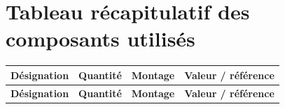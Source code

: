 \documentclass{report}
\begin{document}
\newpage

\chapter{Tableau récapitulatif des composants utilisés}

\small
\renewcommand{\arraystretch}{1.25}

\begin{longtable}{|p{5cm}|c|c|p{5cm}|}
\hline
\textbf{Désignation} & \textbf{Quantité} & \textbf{Montage} & \textbf{Valeur / référence} \\
\hline
\endfirsthead

\hline
\textbf{Désignation} & \textbf{Quantité} & \textbf{Montage} & \textbf{Valeur / référence} \\
\hline
\endhead


\end{longtable}
\end{document}
